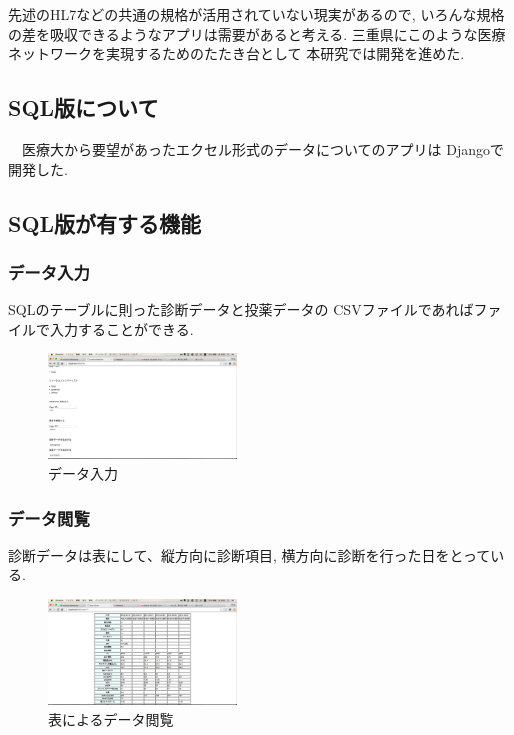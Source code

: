先述のHL7などの共通の規格が活用されていない現実があるので,
いろんな規格の差を吸収できるようなアプリは需要があると考える.
三重県にこのような医療ネットワークを実現するためのたたき台として
本研究では開発を進めた.

\subsection{SQL版について}
　医療大から要望があったエクセル形式のデータについてのアプリは
  Djangoで開発した.

\subsection{SQL版が有する機能}
  \subsubsection{データ入力}
    SQLのテーブルに則った診断データと投薬データの
    CSVファイルであればファイルで入力することができる.

    \begin{figure}[htbp]
  		\begin{center}
  			\includegraphics[width=5cm, bb=0 0 645 790]{./gazou/DjangoFileio.png} %
  		\end{center}
  		\caption{データ入力}
  		\label{DjangoFileio}
  	\end{figure}

  \subsubsection{データ閲覧}
    診断データは表にして、縦方向に診断項目,
    横方向に診断を行った日をとっている.

    \begin{figure}[htbp]
      \begin{center}
        \includegraphics[width=5cm, bb=0 0 645 790]{./gazou/DjangoTable.png} %
      \end{center}
      \caption{表によるデータ閲覧}
      \label{DjangoTable}
    \end{figure}

